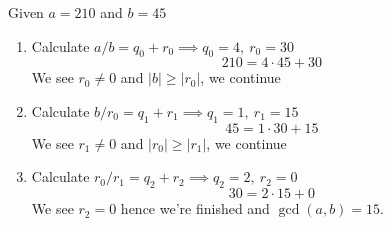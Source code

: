 \begin{example}
   Given \(a = 210\) and \(b = 45\)
   \begin{enumerate}
      \item Calculate \(a / b = q_0 + r_0 \implies q_0 = 4,~r_0 = 30\)
         \[210 = 4 \cdot 45 + 30\]
         We see \(r_0 \neq 0\) and \(|b| \geq |r_0|\), we continue
      \item Calculate \(b / r_0 = q_1 + r_1 \implies q_1 = 1,~r_1 = 15\)
         \[45 = 1 \cdot 30 + 15\]
         We see \(r_1 \neq 0\) and \(|r_0| \geq |r_1|\), we continue
      \item Calculate \(r_0 / r_1 = q_2 + r_2 \implies q_2 = 2,~r_2 = 0\)
         \[30 = 2 \cdot 15 + 0\]
         We see \(r_2 = 0\) hence we're finished and \(\gcd(a, b) = 15\).
   \end{enumerate}
\end{example}

